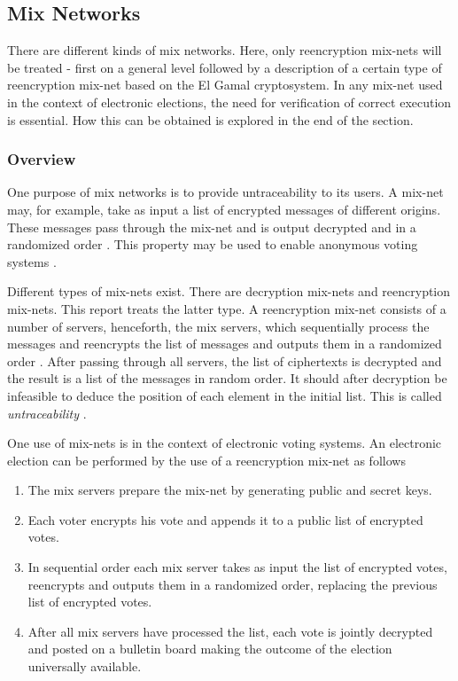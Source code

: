 \subsection{Mix Networks}

There are different kinds of mix networks. Here, only reencryption
mix-nets will be treated - first on a general level followed by a
description of a certain type of reencryption mix-net based on the El
Gamal cryptosystem. In any mix-net used in the context of electronic
elections, the need for verification of correct execution is
essential. How this can be obtained is explored in the end of the
section.

\subsubsection{Overview}
One purpose of mix networks is to provide untraceability to its
users. A mix-net may, for example, take as input a list of encrypted
messages of different origins. These messages pass through the mix-net
and is output decrypted and in a randomized order \cite{mixnets}. This
property may be used to enable anonymous voting systems \cite{mixnets2}.

Different types of mix-nets exist. There are decryption mix-nets and
reencryption mix-nets. This report treats the latter type. A
reencryption mix-net consists of a number of servers, henceforth, the
mix servers, which sequentially process the messages and reencrypts
the list of messages and outputs them in a randomized order
\cite{mixnets}. After passing through all servers, the list of
ciphertexts is decrypted and the result is a list of the messages in
random order. It should after decryption be infeasible to deduce the
position of each element in the initial list. This is called
\emph{untraceability} \cite{mixnets2}.

One use of mix-nets is in the context of electronic voting systems. An
electronic election can be performed by the use of a reencryption
mix-net as follows \cite{electronicvoting} \\
\begin{enumerate}
\item The mix servers prepare the mix-net by generating public and
  secret keys.
\item Each voter encrypts his vote and appends it to a public list of
  encrypted votes.
\item In sequential order each mix server takes as input the list of
  encrypted votes, reencrypts and outputs them in a randomized order,
  replacing the previous list of encrypted votes.
\item After all mix servers have processed the list, each vote is
  jointly decrypted and posted on a bulletin board making the outcome
  of the election universally available.
\end{enumerate}

